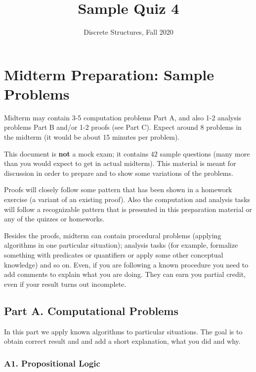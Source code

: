 \documentclass[jou]{apa6}
\title{Sample Quiz 4}
\author{Discrete Structures, Fall 2020}
\affiliation{RBS}
\begin{document}

\twocolumn
\section{Midterm Preparation: Sample Problems}

{\footnotesize
Midterm may contain 3-5 computation problems \textendash{}
Part A, and also 1-2 analysis problems \textendash{} Part B and/or 
1-2 proofs (see Part C). Expect around 8 problems in the midterm (it would be 
about 15 minutes per problem). 

This document is {\bf not} a mock exam; it contains $42$ sample questions
(many more than you would expect to get in actual midterm). This material 
is meant for discussion in order to prepare and to show some variations of the 
problems.

Proofs will closely follow some pattern that has been shown in a homework 
exercise (a variant of an existing proof). 
Also the computation and analysis tasks will follow a 
recognizable pattern that is presented in this preparation material 
or any of the quizzes or homeworks.

Besides the proofs, midterm can contain
procedural problems (applying algorithms in one
particular situation); analysis tasks (for example, 
formalize something with predicates or quantifiers or apply some
other conceptual knowledge) and so on. 
Even, if you are following a known procedure
you need to add comments to explain what you are doing. 
They can earn you partial credit, 
even if your result turns out incomplete.
}


\subsection{Part A. Computational Problems}

In this part we apply known algorithms to particular situations. 
The goal is to obtain correct result and and add a short explanation, what 
you did and why.

\subsubsection{A1. Propositional Logic}
\end{document}
